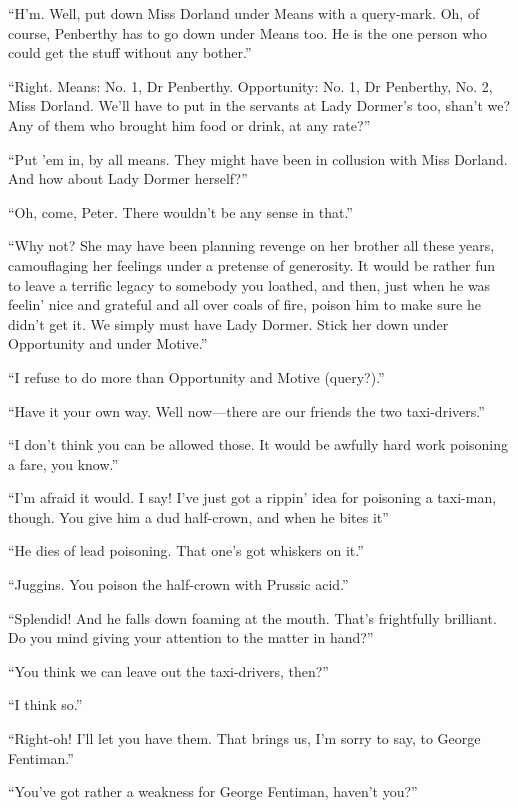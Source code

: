 \enquote{H'm. Well, put down Miss Dorland under Means with a query-mark. Oh, of course, Penberthy has to go down under Means too. He is the one person who could get the stuff without any bother.}

\enquote{Right. Means: No. 1, Dr Penberthy. Opportunity: No. 1, Dr Penberthy, No. 2, Miss Dorland. We'll have to put in the servants at Lady Dormer's too, shan't we? Any of them who brought him food or drink, at any rate?}

\enquote{Put 'em in, by all means. They might have been in collusion with Miss Dorland. And how about Lady Dormer herself?}

\enquote{Oh, come, Peter. There wouldn't be any sense in that.}

\enquote{Why not? She may have been planning revenge on her brother all these years, camouflaging her feelings under a pretense of generosity. It would be rather fun to leave a terrific legacy to somebody you loathed, and then, just when he was feelin' nice and grateful and all over coals of fire, poison him to make sure he didn't get it. We simply must have Lady Dormer. Stick her down under Opportunity and under Motive.}

\enquote{I refuse to do more than Opportunity and Motive (query?).}

\enquote{Have it your own way. Well now\allowbreak---\allowbreak there are our friends the two taxi-drivers.}

\enquote{I don't think you can be allowed those. It would be awfully hard work poisoning a fare, you know.}

\enquote{I'm afraid it would. I say! I've just got a rippin' idea for poisoning a taxi-man, though. You give him a dud half-crown, and when he bites it\longdash}

\enquote{He dies of lead poisoning. That one's got whiskers on it.}

\enquote{Juggins. You poison the half-crown with Prussic acid.}

\enquote{Splendid! And he falls down foaming at the mouth. That's frightfully brilliant. Do you mind giving your attention to the matter in hand?}

\enquote{You think we can leave out the taxi-drivers, then?}

\enquote{I think so.}

\enquote{Right-oh! I'll let you have them. That brings us, I'm sorry to say, to George Fentiman.}

\enquote{You've got rather a weakness for George Fentiman, haven't you?}

